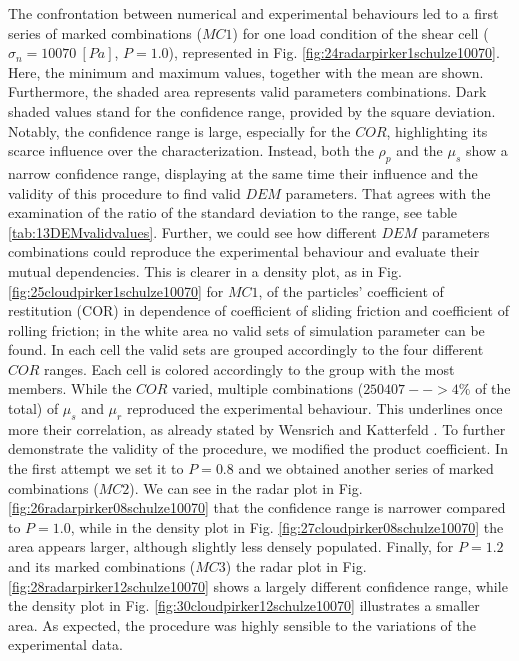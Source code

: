 The confrontation between numerical and experimental behaviours led to a first
series of marked combinations ($MC1$) for one load condition of
the shear cell ($\sigma_n=10070 ~[Pa]$, $P=1.0$), represented in Fig.
\ref{fig:24radarpirker1schulze10070}.
Here, the minimum and maximum values, together with the mean are shown. 
Furthermore, the shaded area represents valid parameters combinations.
Dark shaded values stand for the confidence range, provided by the square
deviation.
Notably, the confidence range is large, 
especially for the $COR$, highlighting its scarce influence over the characterization. 
Instead, both the $\rho_p$  and the $\mu_s$ show a narrow confidence range, 
displaying at the same time their influence and the validity of this procedure to find valid $DEM$ parameters. 
That agrees with the examination of the ratio of the standard deviation to the
range, see table \ref{tab:13DEMvalidvalues}.
Further, we could see how different $DEM$ parameters
combinations could reproduce the experimental behaviour and evaluate their mutual dependencies. 
This is clearer in a density plot, as in Fig. 
\ref{fig:25cloudpirker1schulze10070} for $MC1$, 
of the particles' coefficient of restitution (COR) in dependence
of coefficient of sliding friction and coefficient of rolling friction; in the
white area no valid sets of simulation parameter can be found.
In each cell the valid sets are grouped accordingly to the four different $COR$
ranges.
Each cell is colored accordingly to the group with the most members. 
While the $COR$ varied, multiple
combinations ($250407 --> 4\% $ of the total) of $\mu_s$ and $\mu_r$ reproduced
the experimental behaviour.
This underlines once more their correlation, as already stated by Wensrich and 
Katterfeld \cite{RefWorks:87}.
To further demonstrate the validity of the procedure, we modified the product
coefficient. In the first attempt we set it to $P=0.8$ and we obtained another
series of marked combinations ($MC2$).
We can see in the radar plot in Fig.
\ref{fig:26radarpirker08schulze10070} that the confidence range is narrower
compared to $P=1.0$, while in the density plot in Fig. 
\ref{fig:27cloudpirker08schulze10070} the area
appears larger, although slightly less densely populated. Finally, for $P=1.2$
and its marked combinations ($MC3$) the radar plot in Fig.
\ref{fig:28radarpirker12schulze10070} shows a largely different confidence
range, while the density plot in Fig. \ref{fig:30cloudpirker12schulze10070} 
illustrates a smaller area. As expected, the procedure was highly sensible to the variations of the experimental data. 

